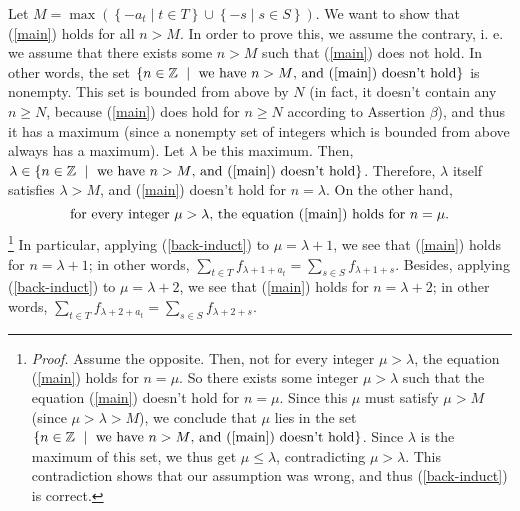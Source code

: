 \documentclass[12pt,final,notitlepage,onecolumn]{article}%
\begin{document}
Let $M=\max\left(  \left\{  -a_{t}\mid t\in T\right\}  \cup\left\{  -s\mid
s\in S\right\}  \right)  $. We want to show that (\ref{main}) holds for all
$n>M$. In order to prove this, we assume the contrary, i. e. we assume that
there exists some $n>M$ such that (\ref{main}) does not hold. In other words,
the set $\left\{  n\in\mathbb{Z}\ \mid\ \text{we have }n>M\text{, and
(\ref{main}) doesn't hold}\right\}  $ is nonempty. This set is bounded from
above by $N$ (in fact, it doesn't contain any $n\geq N$, because (\ref{main})
does hold for $n\geq N$ according to Assertion $\beta$), and thus it has a
maximum (since a nonempty set of integers which is bounded from above always
has a maximum). Let $\lambda$ be this maximum. Then, $\lambda\in\left\{
n\in\mathbb{Z}\ \mid\ \text{we have }n>M\text{, and (\ref{main}) doesn't
hold}\right\}  $. Therefore, $\lambda$ itself satisfies $\lambda>M$, and
(\ref{main}) doesn't hold for $n=\lambda$. On the other hand,%
\begin{equation}
\text{for every integer }\mu>\lambda\text{, the equation (\ref{main}) holds
for }n=\mu. \label{back-induct}%
\end{equation}
\footnote{\textit{Proof.} Assume the opposite. Then, not for every integer
$\mu>\lambda$, the equation (\ref{main}) holds for $n=\mu$. So there exists
some integer $\mu>\lambda$ such that the equation (\ref{main}) doesn't hold
for $n=\mu$. Since this $\mu$ must satisfy $\mu>M$ (since $\mu>\lambda>M$), we
conclude that $\mu$ lies in the set $\left\{  n\in\mathbb{Z}\ \mid\ \text{we
have }n>M\text{, and (\ref{main}) doesn't hold}\right\}  $. Since $\lambda$ is
the maximum of this set, we thus get $\mu\leq\lambda$, contradicting
$\mu>\lambda$. This contradiction shows that our assumption was wrong, and
thus (\ref{back-induct}) is correct.} In particular, applying
(\ref{back-induct}) to $\mu=\lambda+1$, we see that (\ref{main}) holds for
$n=\lambda+1$; in other words, $\sum\limits_{t\in T}f_{\lambda+1+a_{t}}%
=\sum\limits_{s\in S}f_{\lambda+1+s}$. Besides, applying (\ref{back-induct})
to $\mu=\lambda+2$, we see that (\ref{main}) holds for $n=\lambda+2$; in other
words, $\sum\limits_{t\in T}f_{\lambda+2+a_{t}}=\sum\limits_{s\in S}%
f_{\lambda+2+s}$.
\end{document}
